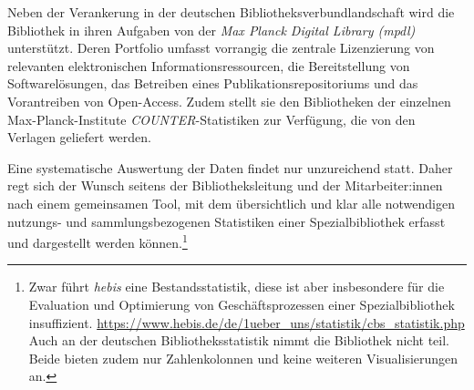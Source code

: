 Neben der Verankerung in der deutschen Bibliotheksverbundlandschaft
wird die Bibliothek in ihren Aufgaben von der
\textit{Max Planck Digital Library (mpdl)}
unterstützt. Deren Portfolio umfasst vorrangig die zentrale Lizenzierung
von relevanten elektronischen Informationsressourcen, die Bereitstellung
von Softwarelösungen, das Betreiben eines Publikationsrepositoriums und
das Vorantreiben von Open-Access. Zudem stellt sie den Bibliotheken der einzelnen Max-Planck-Institute
\textit{COUNTER}-Statistiken zur Verfügung, die von den Verlagen geliefert werden.



Eine systematische Auswertung der Daten findet nur unzureichend statt.
Daher regt sich der Wunsch seitens der Bibliotheksleitung und der Mitarbeiter:innen nach einem gemeinsamen Tool,
mit dem übersichtlich und klar alle notwendigen nutzungs- und sammlungsbezogenen Statistiken einer
Spezialbibliothek erfasst und dargestellt werden können.\footnote{Zwar führt \textit{hebis} eine Bestandsstatistik, diese ist aber insbesondere für die
Evaluation und Optimierung von Geschäftsprozessen einer Spezialbibliothek
insuffizient. \url{https://www.hebis.de/de/1ueber_uns/statistik/cbs_statistik.php} 
Auch an der deutschen Bibliotheksstatistik nimmt die Bibliothek nicht teil. Beide bieten zudem nur Zahlenkolonnen und keine weiteren Visualisierungen an.}

